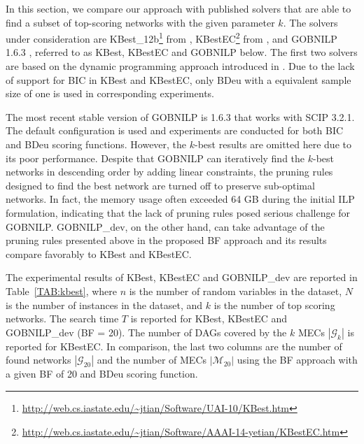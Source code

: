 \documentclass[letterpaper]{article}
\newcommand{\graphset}{\mathcal{G}}
\newcommand{\gobnilp}{GOBNILP}
\begin{document}
In this section, we compare our approach with published solvers that are able to find a subset of top-scoring networks with the given parameter $k$. The solvers under consideration are KBest\_12b\footnote{\url{http://web.cs.iastate.edu/~jtian/Software/UAI-10/KBest.htm}} from \cite{TianHR10}, KBestEC\footnote{\url{http://web.cs.iastate.edu/~jtian/Software/AAAI-14-yetian/KBestEC.htm}} from \cite{ChenT2014}, and GOBNILP 1.6.3
\cite{BartlettC13}, referred to as KBest, KBestEC and GOBNILP below. The first two solvers are based on the dynamic programming approach introduced in \cite{SilanderM06}. 
Due to the lack of support for BIC in KBest and KBestEC, only BDeu with a equivalent sample size of one is used in corresponding experiments.

The most recent stable version of \gobnilp{} is 1.6.3 that works with SCIP 3.2.1. The default configuration is used and experiments are conducted for both BIC and BDeu scoring functions. However, the $k$-best results are omitted here due to its poor performance. Despite that \gobnilp{} can iteratively find the $k$-best networks in descending order by adding linear constraints, the pruning rules designed to find the best network are turned off to preserve sub-optimal networks. In fact, the memory usage often exceeded 64 GB during the initial ILP formulation, indicating that the lack of pruning rules posed serious challenge for GOBNILP. \gobnilp{\_dev}, on the other hand, can take advantage of the pruning rules presented above in the proposed BF approach and its results compare favorably to KBest and KBestEC.

The experimental results of KBest, KBestEC and \gobnilp{\_dev} are reported in Table~\ref{TAB:kbest}, where $n$ is the number of random variables in the dataset, $N$ is the number of instances in the dataset, and $k$ is the number of top scoring networks. The search time $T$ is reported for KBest, KBestEC and GOBNILP\_dev (BF = 20). The number of DAGs covered by the $k$ MECs $|\graphset_k|$ is reported for KBestEC. In comparison, the last two columns are the number of found networks $|\graphset_{20}|$ and the number of MECs $|\mathcal{M}_{20}|$ using the BF approach with a given BF of 20 and BDeu scoring function.
\end{document}
